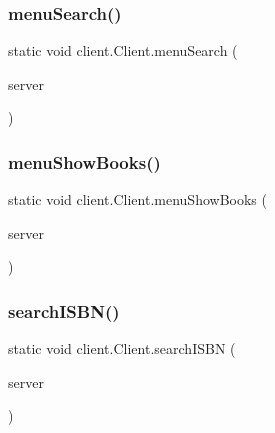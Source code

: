 \mbox{\label{classclient_1_1_client_aa705054047bb8f7fef9173a9f0980707}} 
\subsubsection{\texorpdfstring{menu\+Search()}{menuSearch()}}
{\footnotesize\ttfamily static void client.\+Client.\+menu\+Search (\begin{DoxyParamCaption}\item[{\hyperlink{interfaceserver_1_1remote_1_1_i_remote}{I\+Remote}}]{server }\end{DoxyParamCaption})\hspace{0.3cm}{\ttfamily [static]}}

\mbox{\label{classclient_1_1_client_a5949234ea4d0f331260d4265c8de9967}} 
\subsubsection{\texorpdfstring{menu\+Show\+Books()}{menuShowBooks()}}
{\footnotesize\ttfamily static void client.\+Client.\+menu\+Show\+Books (\begin{DoxyParamCaption}\item[{\hyperlink{interfaceserver_1_1remote_1_1_i_remote}{I\+Remote}}]{server }\end{DoxyParamCaption})\hspace{0.3cm}{\ttfamily [static]}}

\mbox{\label{classclient_1_1_client_ab4d1b606d620956a59f70c4af4937cc1}} 
\subsubsection{\texorpdfstring{search\+I\+S\+B\+N()}{searchISBN()}}
{\footnotesize\ttfamily static void client.\+Client.\+search\+I\+S\+BN (\begin{DoxyParamCaption}\item[{\hyperlink{interfaceserver_1_1remote_1_1_i_remote}{I\+Remote}}]{server }\end{DoxyParamCaption})\hspace{0.3cm}{\ttfamily [static]}}

